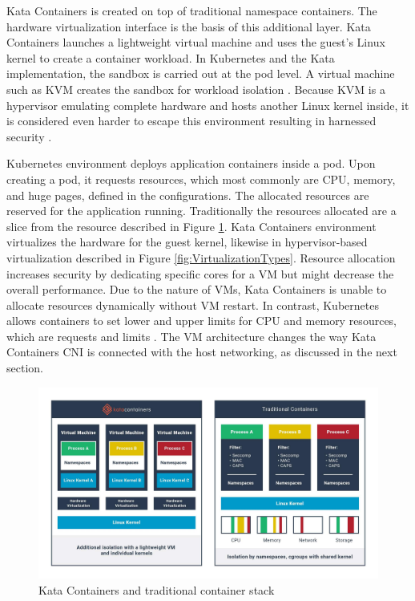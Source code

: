 Kata Containers is created on top of traditional namespace containers. The hardware virtualization interface is the basis of this additional layer. Kata Containers launches a lightweight virtual machine and uses the guest's Linux kernel to create a container workload. In Kubernetes and the Kata implementation, the sandbox is carried out at the pod level. A virtual machine such as KVM creates the sandbox for workload isolation \cite{KataContainersVirtualization}. Because KVM is a hypervisor emulating complete hardware and hosts another Linux kernel inside, it is considered even harder to escape this environment resulting in harnessed security \cite{Eder2016}.

Kubernetes environment deploys application containers inside a pod. Upon creating a pod, it requests resources, which most commonly are CPU, memory, and huge pages, defined in the configurations. The allocated resources are reserved for the application running. Traditionally the resources allocated are a slice from the resource described in Figure \ref{fig:KataContainersStack}. Kata Containers environment virtualizes the hardware for the guest kernel, likewise in hypervisor-based virtualization described in Figure \ref{fig:VirtualizationTypes}. Resource allocation increases security by dedicating specific cores for a VM but might decrease the overall performance. Due to the nature of VMs, Kata Containers is unable to allocate resources dynamically without VM restart. In contrast, Kubernetes allows containers to set lower and upper limits for CPU and memory resources, which are requests and limits \cite{KubernetesContainerResource}. The VM architecture changes the way Kata Containers CNI is connected with the host networking, as discussed in the next section.


\begin{figure}[ht]
  \begin{center}
    \includegraphics[width=13.5cm]{images/KataContainersStack.jpg}
    \caption{Kata Containers and traditional container stack \cite{KataContainers}}
    \label{fig:KataContainersStack}
  \end{center}
\end{figure} 

